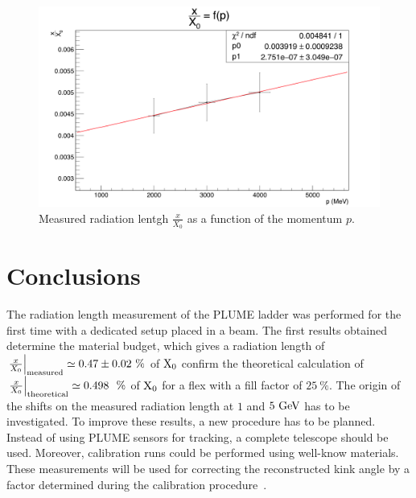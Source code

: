   \begin{figure}
     \centering
     \includegraphics[width =\textwidth]{Pictures/X0/radiationLength_2-4GeV.png}
     \caption{Measured radiation lentgh $\frac{x}{X_0}$ as a function of the momentum $p$.}
     \label{fig:X0vsP}
   \end{figure}

  \section{Conclusions}

  The radiation length measurement of the \gls{PLUME} ladder was performed for the first time with a dedicated setup placed in a beam.
  The first results obtained determine the material budget, which gives a radiation length of $\left. \frac{x}{X_0} \right|_{\rm{measured}} \simeq 0.47 \pm 0.02~\%$ of $\rm{X_0}$  confirm the theoretical calculation of $\left. \frac{x}{X_0}\right|_{\rm{theoretical}} \simeq 0.498~~\%$ of $\rm{X_0}$ for a flex with a fill factor of $25~\%$.
  The origin of the shifts on the measured radiation length at $1$ and $5~\rm{GeV}$ has to be investigated.
  To improve these results, a new procedure has to be planned.
  Instead of using \gls{PLUME} sensors for tracking, a complete telescope should be used.
  Moreover, calibration runs could be performed using well-know materials.
  These measurements will be used for correcting the reconstructed kink angle by a factor determined during the calibration procedure~\cite{Stolzenberg:2016hrj}.

